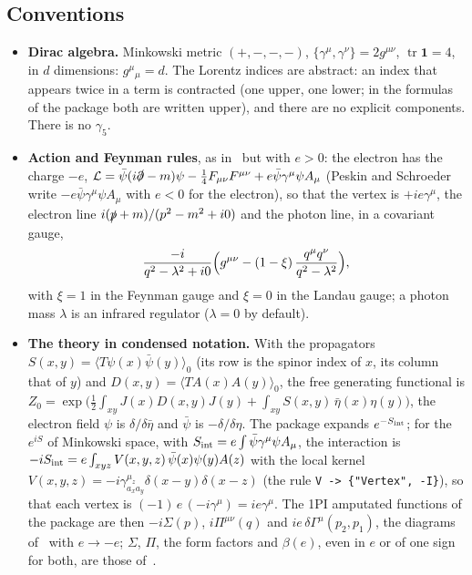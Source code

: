 \documentclass[11pt,a4paper]{article}
\newcommand{\pkg}[1]{\texttt{#1}}
\begin{document}
\subsection{Conventions}\label{sec:qed-conventions}

\begin{itemize}
\item \textbf{Dirac algebra.} Minkowski metric $(+,-,-,-)$, $\{\gamma^\mu,\gamma^\nu\}=2g^{\mu\nu}$, $\operatorname{tr}\mathbf 1=4$,
  in $d$ dimensions: $g^\mu{}_\mu=d$. The Lorentz indices are abstract: an index that appears twice in a term is
  contracted (one upper, one lower; in the formulas of the package both are written upper), and there are no explicit
  components. There is no $\gamma_5$.
\item \textbf{Action and Feynman rules}, as in~\cite{PeskinSchroeder} but with $e>0$: the electron has the charge $-e$,
  $\mathcal L=\bar\psi(i\slashed\partial-m)\psi-\frac14F_{\mu\nu}F^{\mu\nu}+e\bar\psi\gamma^\mu\psi A_\mu$ (Peskin and Schroeder
  write $-e\bar\psi\gamma^\mu\psi A_\mu$ with $e<0$ for the electron), so that the vertex is $+ie\gamma^\mu$, the electron line $i(\slashed p+m)/(p^2-m^2+i0)$ and the photon line, in a covariant gauge,
  \[
  \frac{-i}{q^2-\lambda^2+i0}\Bigl(g^{\mu\nu}-(1-\xi)\,\frac{q^\mu q^\nu}{q^2-\lambda^2}\Bigr),
  \]
  with $\xi=1$ in the Feynman gauge and $\xi=0$ in the Landau gauge; a photon mass $\lambda$ is an infrared regulator
  ($\lambda=0$ by default).
\item \textbf{The theory in condensed notation.} With the propagators $S(x,y)=\langle T\psi(x)\bar\psi(y)\rangle_0$ (its row
  is the spinor index of $x$, its column that of $y$) and $D(x,y)=\langle TA(x)A(y)\rangle_0$, the free generating
  functional is $Z_0=\exp\bigl(\frac12\int_{xy}J(x)D(x,y)J(y)+\int_{xy}S(x,y)\,\bar\eta(x)\eta(y)\bigr)$, the electron field
  $\psi$ is $\delta/\delta\bar\eta$ and $\bar\psi$ is $-\delta/\delta\eta$. The package expands $e^{-S_{\rm int}}$; for the
  $e^{iS}$ of Minkowski space, with $S_{\rm int}=e\int\bar\psi\gamma^\mu\psi A_\mu$, the interaction is
  $-iS_{\rm int}=e\int_{xyz}V(x,y,z)\,\bar\psi(x)\psi(y)A(z)$ with the local
  kernel $V(x,y,z)=-i\gamma^{\mu_z}_{a_xa_y}\delta(x-y)\delta(x-z)$ (the rule \pkg{V -> \{"Vertex", -I\}}), so that each vertex
  is $(-1)\,e\,(-i\gamma^\mu)=ie\gamma^\mu$. The 1PI amputated functions of the package are then $-i\Sigma(p)$,
  $i\Pi^{\mu\nu}(q)$ and $ie\,\delta\Gamma^\mu(p_2,p_1)$, the diagrams of~\cite{PeskinSchroeder} with $e\to-e$; $\Sigma$,
  $\Pi$, the form factors and $\beta(e)$, even in $e$ or of one sign for both, are those of~\cite{PeskinSchroeder}.

\end{itemize}
\end{document}
